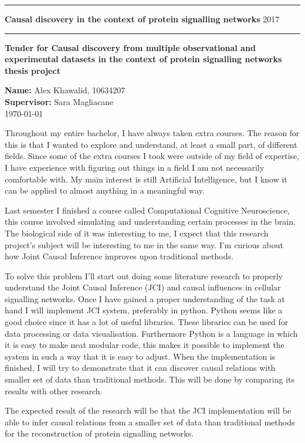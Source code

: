 \documentclass[11pt]{article}
\begin{document}
\rule{\textwidth}{1pt}

\textbf{Causal discovery in the context of protein signalling networks} \hfill 2017
\rule{\textwidth}{1pt}
\vspace*{20pt}


\textbf{Tender for Causal discovery from multiple observational and experimental datasets in the context of protein signalling networks thesis project}

\textbf{Name:} Alex Khawalid, 10634207\\
\textbf{Supervisor:} Sara Magliacane\\
\today

Throughout my entire bachelor, I have always taken extra courses. The reason for this is that I wanted to explore and understand, at least a small part, of different fields. Since some of the extra courses I took were outside of my field of expertise, I have experience with figuring out things in a field I am not necessarily comfortable with.  My main interest is still Artificial Intelligence, but I know it can be applied to almost anything in a meaningful way.

Last semester I finished a course called Computational Cognitive Neuroscience, this course involved simulating and understanding certain processes in the brain. The biological side of it was interesting to me, I expect that this research project's subject will be interesting to me in the same way. I'm curious about how Joint Causal Inference improves upon traditional methods.

To solve this problem I'll start out doing some literature research to properly understand the Joint Causal Inference (JCI) and causal influences in cellular signalling networks. Once I have gained a proper understanding of the task at hand I will implement JCI system, preferably in python. Python seems like a good choice since it has a lot of useful libraries. These libraries can be used for data processing or data visualisation. Furthermore Python is a language in which it is easy to make neat modular code, this makes it possible to implement the system in such a way that it is easy to adjust. When the implementation is finished, I will try to demonstrate that it can discover causal relations with smaller set of data than traditional methods. This will be done by comparing its results with other research. 

The expected result of the research will be that the JCI implementation will be able to infer causal relations from a smaller set of data than traditional methods for the reconstruction of protein signalling networks.
\end{document}
